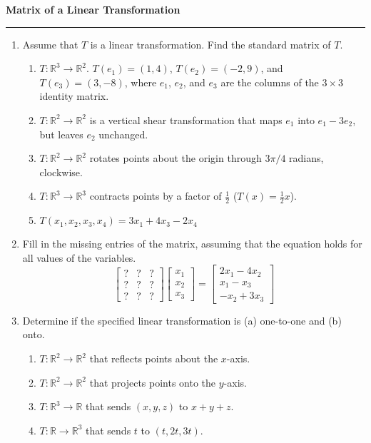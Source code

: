 \documentclass[12pt]{article}
\newcommand{\reals}{\mathbb{R}}
\begin{document}
\begin{center}
{\bf \Large Matrix of a Linear Transformation}
\vspace{0.2cm}
\hrule
\end{center}
\begin{multicols*}{2}
	\begin{enumerate}
		\item Assume that $T$ is a linear transformation. Find the standard matrix of $T$.
		\begin{enumerate}
			\item $T:\reals^3\to \reals^2$. $T(e_1) = (1,4)$, $T(e_2) = (-2, 9)$, and $T(e_3) = (3, -8)$, where $e_1$, $e_2$, and $e_3$ are the columns of the $3\times 3$ identity matrix.
			\vfill
			\item $T:\reals^2\to \reals^2$ is a vertical shear transformation that maps $e_1$ into $e_1-3e_2$, but leaves $e_2$ unchanged.
			\vfill
			\item $T:\reals^2\to \reals^2$ rotates points about the origin through $3\pi/4$ radians, clockwise.
			\vfill
			\item $T:\reals^3\to \reals^3$ contracts points by a factor of $\frac{1}{2}$ ($T(x) = \frac{1}{2}x$).
			\vfill
			\item $T(x_1, x_2, x_3, x_4) = 3x_1 + 4x_3-2x_4$
		\end{enumerate}
		\vfill
		\item Fill in the missing entries of the matrix, assuming that the equation holds for all values of the variables.
		\[
		\begin{bmatrix}
			? & ? & ?\\
			? & ? & ?\\
			? & ? & ?
		\end{bmatrix}\begin{bmatrix}
			x_1\\x_2\\x_3
		\end{bmatrix}=\begin{bmatrix}
			2x_1 - 4x_2\\
			x_1 - x_3\\
			-x_2 + 3x_3
		\end{bmatrix}
		\]
		\vfill\null\columnbreak

		\item Determine if the specified linear transformation is (a) one-to-one and (b) onto.
		\begin{enumerate}
			\item $T:\reals^2\to \reals^2$ that reflects points about the $x$-axis.
			\vfill
			\item $T:\reals^2\to \reals^2$ that projects points onto the $y$-axis.
			\vfill
			\item $T:\reals^3\to \reals$ that sends $(x,y,z)$ to $x+y+z$.
			\vfill
			\item $T:\reals\to \reals^3$ that sends $t$ to $(t, 2t, 3t)$.
		\end{enumerate}
		\vfill


\end{enumerate}
\end{multicols*}
\end{document}
